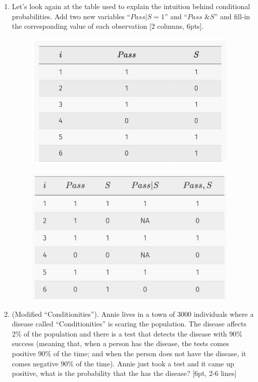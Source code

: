 \documentclass[answers]{exam}
\begin{document}
\begin{enumerate}
\item Let’s look again at the table used to explain the intuition behind conditional probabilities. Add two new variables “$Pass|S=1$” and “$Pass \text{ \& } S$” and fill-in the corresponding value of each observation [2 columns, 6pts]. 
\begin{figure}[H]
    \centering
    \includegraphics[width=4in]{Figures/midterm_pass.png}
    \caption{}
    \label{}
\end{figure}
\begin{solution}
	\begin{figure}[H]
    \centering
    \includegraphics[width=4in]{Figures/midterm_pass_sol.png}
    \caption{}
    \label{}
\end{figure}
	\end{solution}


\item (Modified ``Conditionities''). Annie lives in a town of 3000 individuals where a disease called ``Conditionities'' is scaring the population. The disease affects 2\% of the population and there is a test that detects the disease with 90\% success (meaning that, when a person has the disease, the tests comes positive 90\% of the time; and when the person does not have the disease, it comes negative 90\% of the time). Annie just took a test and it came up positive, what is the probability that the has the disease? [6pt, 2-6 lines] 


\end{enumerate}
\end{document}
